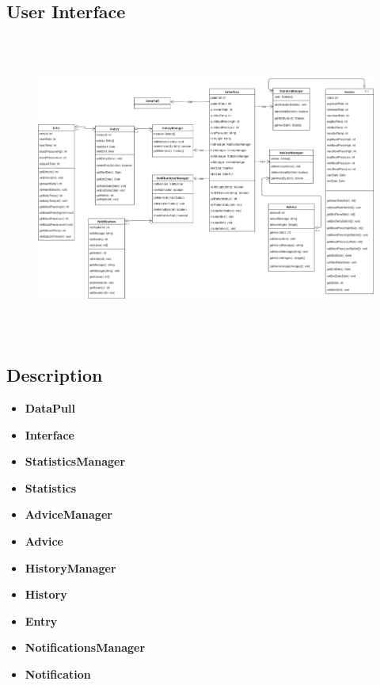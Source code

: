 \subsection{User Interface}
\begin{center}
\begin{figure}[h]
	\includegraphics[width=15cm, height=10cm]{Interface.PNG}
\end{figure}
\end{center}

\subsection{Description}
\begin{itemize}
	\item \textbf{DataPull}
	\item \textbf{Interface}
	\item \textbf{StatisticsManager}
	\item \textbf{Statistics}
	\item \textbf{AdviceManager}
	\item \textbf{Advice}
  \item \textbf{HistoryManager}
  \item \textbf{History}
  \item \textbf{Entry}
  \item \textbf{NotificationsManager}
  \item \textbf{Notification}
\end{itemize}
